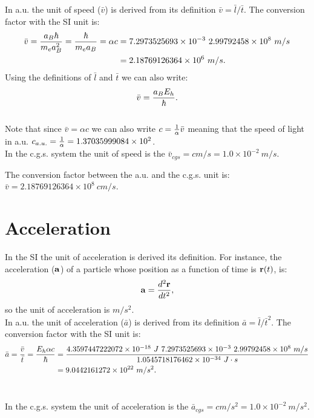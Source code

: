 \documentclass[12pt,a4paper]{article}
\def\hbarf{1.0545718176462\times 10^{-34}}
\def\cspeed{2.99792458\times 10^{8}}
\def\alphaf{7.2973525693\times 10^{-3}}
\def\barv{2.18769126364\times 10^{6}}
\def\bara{9.0442161272\times 10^{22}}
\def\baru{4.3597447222072\times 10^{-18}}
\def\cmtom{1.0\times 10^{-2}}
\def\barvcgs{2.18769126364\times 10^{8}}
\def\cspeedau{1.37035999084\times 10^{2}}
\begin{document}
{\color{web-blue} In a.u. the unit of speed ($\bar v$) is derived 
from its definition $\bar v = \bar l / \bar t$. The conversion factor
with the SI unit is:
\begin{align}
\bar v ={a_B \hbar \over m_e a_B^2}={\hbar \over m_e a_B}=\alpha c&=
 {\alphaf\  \cspeed\ m/s}\nonumber \\ 
&=\barv\ m/s.
\end{align}
Using the definitions of $\bar l$ and $\bar t$ we can also write:
\begin{equation}
\bar v={a_B E_h \over \hbar}.
\end{equation}
\\
Note that since $\bar v= \alpha c$ we can also write 
$c={1\over \alpha} \bar v$ meaning that the speed of light in a.u. 
$c_{a.u.}={1\over\alpha}=\cspeedau$.
}
\\

{\color{orange} In the c.g.s. system the unit of speed is the 
$\bar v_{cgs}=cm/s = \cmtom\ m/s$.
\\
}

{\color{green} The conversion factor between the a.u. and the c.g.s. unit is:
$\bar v=\barvcgs\ cm/s$.
\\
}

\newpage
\section{\color{coral}Acceleration}
In the SI the unit of acceleration is derived its  
definition. For instance, the acceleration (${\bf a}$) of a particle whose
position as a function of time is ${\bf r}(t)$, is: 
\begin{equation}
{\bf a}={d^2{\bf r} \over dt^2},
\end{equation} 
so the unit of acceleration is $m/s^2$.
\\

{\color{web-blue} In a.u. the unit of acceleration ($\bar a$) is derived 
from its definition $\bar a = \bar l / \bar t^2$. The conversion factor
with the SI unit is:
\begin{align}
\bar a = {\bar v \over \bar t}={E_h \alpha c \over \hbar}&= 
{\baru\ J\ \alphaf\ \cspeed\ m/s \over \hbarf\ J\cdot s}\nonumber \\
&= \bara\ m/s^2.
\end{align}
\\
}

{\color{orange} In the c.g.s. system the unit of acceleration is the $\bar a_{cgs}=cm/s^2 = \cmtom\ m/s^2$.
\\
}
\end{document}
